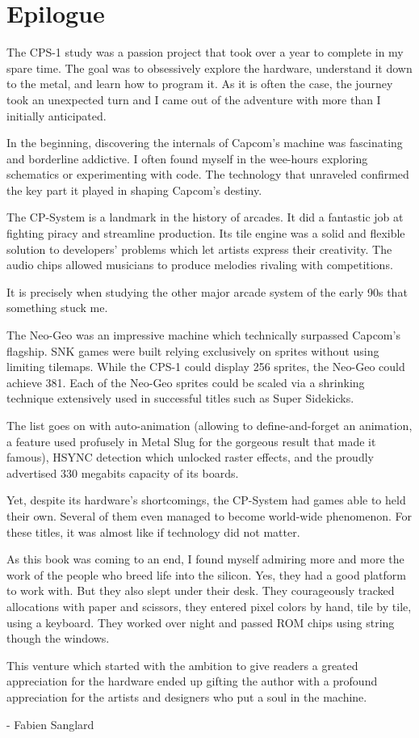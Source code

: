 \chapter{Epilogue} 

The CPS-1 study was a passion project that took over a year to complete in my spare time. The goal was to obsessively explore the hardware, understand it down to the metal, and learn how to program it. As it is often the case, the journey took an unexpected turn and I came out of the adventure with more than I initially anticipated.

In the beginning, discovering the internals of Capcom's machine was fascinating and borderline addictive. I often found myself in the wee-hours exploring schematics or experimenting with code. The technology that unraveled confirmed the key part it played in shaping Capcom's destiny. 

The CP-System is a landmark in the history of arcades. It did a fantastic job at fighting piracy and streamline production. Its tile engine was a solid and flexible solution to developers' problems which let artists express their creativity. The audio chips allowed musicians to produce melodies rivaling with competitions.

It is precisely when studying the other major arcade system of the early 90s that something stuck me. 

The Neo-Geo was an impressive machine which technically surpassed Capcom's flagship. SNK games were built relying exclusively on sprites without using limiting tilemaps. While the CPS-1 could display 256 sprites, the Neo-Geo could achieve 381. Each of the Neo-Geo sprites could be scaled via a shrinking technique extensively used in successful titles such as Super Sidekicks. 

The list goes on with auto-animation (allowing to define-and-forget an animation, a feature used profusely in Metal Slug for the gorgeous result that made it famous), HSYNC detection which unlocked raster effects, and the proudly advertised 330 megabits capacity of its boards.

Yet, despite its hardware's shortcomings, the CP-System had games able to held their own. Several of them even managed to become world-wide phenomenon. For these titles, it was almost like if technology did not matter.

As this book was coming to an end, I found myself admiring more and more the work of the people who breed life into the silicon. Yes, they had a good platform to work with. But they also slept under their desk. They courageously tracked allocations with paper and scissors, they entered pixel colors by hand, tile by tile, using a keyboard. They worked over night and passed ROM chips using string though the windows. 

This venture which started with the ambition to give readers a greated appreciation for the hardware ended up gifting the author with a profound appreciation for the artists and designers who put a soul in the machine.

- Fabien Sanglard
